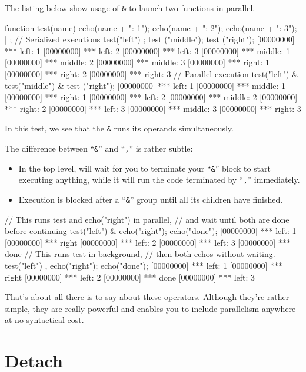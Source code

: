 The listing below show usage of \lstinline{&} to
launch two functions in parallel.

\begin{urbiscript}
function test(name)
{
  echo(name + ": 1");
  echo(name + ": 2");
  echo(name + ": 3");
} | {};
// Serialized executions
test("left") ; test ("middle"); test ("right");
[00000000] *** left: 1
[00000000] *** left: 2
[00000000] *** left: 3
[00000000] *** middle: 1
[00000000] *** middle: 2
[00000000] *** middle: 3
[00000000] *** right: 1
[00000000] *** right: 2
[00000000] *** right: 3
// Parallel execution
test("left") & test("middle") & test ("right");
[00000000] *** left: 1
[00000000] *** middle: 1
[00000000] *** right: 1
[00000000] *** left: 2
[00000000] *** middle: 2
[00000000] *** right: 2
[00000000] *** left: 3
[00000000] *** middle: 3
[00000000] *** right: 3
\end{urbiscript}

In this test, we see that the \lstinline{&} runs its operands
simultaneously.

The difference between ``\lstinline{&}'' and ``\lstinline{,}'' is
rather subtle:

\begin{itemize}
\item In the top level, will wait for you to terminate your
  ``\lstinline{&}'' block to start executing anything, while it will
  run the code terminated by ``\lstinline{,}'' immediately.
\item Execution is blocked after a ``\lstinline{&}'' group until all
  its children have finished.
\end{itemize}

\begin{urbiscript}
// This runs test and echo("right") in parallel,
// and wait until both are done before continuing
test("left") & echo("right"); echo("done");
[00000000] *** left: 1
[00000000] *** right
[00000000] *** left: 2
[00000000] *** left: 3
[00000000] *** done
// This runs test in background,
// then both echos without waiting.
test("left") , echo("right"); echo("done");
[00000000] *** left: 1
[00000000] *** right
[00000000] *** left: 2
[00000000] *** done
[00000000] *** left: 3
\end{urbiscript}

That's about all there is to say about these operators. Although
they're rather simple, they are really powerful and enables you to
include parallelism anywhere at no syntactical cost.

\section{Detach}

